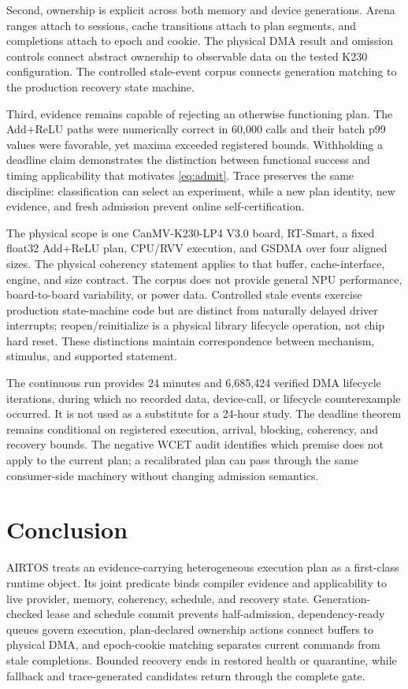 \documentclass[lettersize,journal]{IEEEtran}
\begin{document}
Second, ownership is explicit across both memory and device generations.
Arena ranges attach to sessions, cache transitions attach to plan segments,
and completions attach to epoch and cookie. The physical DMA result and
omission controls connect abstract ownership to observable data on the tested
K230 configuration. The controlled stale-event corpus connects generation
matching to the production recovery state machine.

Third, evidence remains capable of rejecting an otherwise functioning plan.
The Add+ReLU paths were numerically correct in 60,000 calls and their batch p99
values were favorable, yet maxima exceeded registered bounds. Withholding a
deadline claim demonstrates the distinction between functional success and
timing applicability that motivates \cref{eq:admit}. Trace preserves the same
discipline: classification can select an experiment, while a new plan identity,
new evidence, and fresh admission prevent online self-certification.

The physical scope is one CanMV-K230-LP4 V3.0 board, RT-Smart, a fixed float32
Add+ReLU plan, CPU/RVV execution, and GSDMA over four aligned sizes. The
physical coherency statement applies to that buffer, cache-interface, engine,
and size contract. The corpus does not provide general NPU performance,
board-to-board variability, or power data. Controlled stale events exercise
production state-machine code but are distinct from naturally delayed driver
interrupts; reopen/reinitialize is a physical library lifecycle operation, not
chip hard reset. These distinctions maintain correspondence between mechanism,
stimulus, and supported statement.

The continuous run provides 24 minutes and 6,685,424 verified DMA lifecycle
iterations, during which no recorded data, device-call, or lifecycle
counterexample occurred. It is not used as a substitute for a 24-hour study.
The deadline theorem remains conditional on registered execution, arrival,
blocking, coherency, and recovery bounds. The negative WCET audit identifies
which premise does not apply to the current plan; a recalibrated plan can pass
through the same consumer-side machinery without changing admission semantics.

\section{Conclusion}
AIRTOS treats an evidence-carrying heterogeneous execution plan as a
first-class runtime object. Its joint predicate binds compiler evidence and
applicability to live provider, memory, coherency, schedule, and recovery
state. Generation-checked lease and schedule commit prevents half-admission,
dependency-ready queues govern execution, plan-declared ownership actions
connect buffers to physical DMA, and epoch-cookie matching separates current
commands from stale completions. Bounded recovery ends in restored health or
quarantine, while fallback and trace-generated candidates return through the
complete gate.
\end{document}
